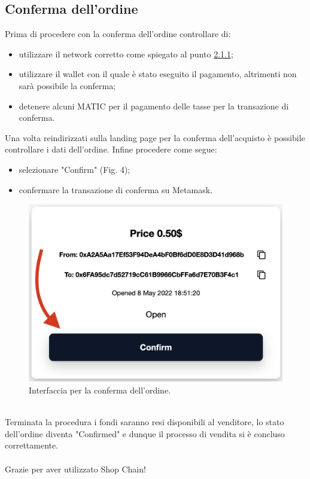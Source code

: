 \documentclass[a4paper, 12pt]{article}
\begin{document}
\subsection{Conferma dell'ordine}
Prima di procedere con la conferma dell'ordine controllare di:
\begin{itemize}
\item utilizzare il network corretto come spiegato al punto \hyperref[sec:network]{2.1.1};
\item utilizzare il wallet con il quale è stato eseguito il pagamento, altrimenti non sarà possibile la conferma;
\item detenere alcuni MATIC per il pagamento delle tasse per la transazione di conferma.
\end{itemize}
Una volta reindirizzati sulla landing page per la conferma dell'acquisto è possibile controllare i dati dell'ordine. Infine procedere come segue:
\begin{itemize}
\item selezionare "Confirm" (Fig. 4);
\item confermare la transazione di conferma su Metamask.
\end{itemize}
\FloatBarrier
\begin{figure}[!h]
\centering
\includegraphics[width=0.6\linewidth]{img/conferma_ordine.png}
\caption{Interfaccia per la conferma dell'ordine.}
\end{figure}
\FloatBarrier
\mbox{}\\
Terminata la procedura i fondi saranno resi disponibili al venditore, lo stato dell'ordine diventa "Confirmed" e dunque il processo di vendita si è concluso correttamente.
\\ \\
Grazie per aver utilizzato Shop Chain!
\end{document}
